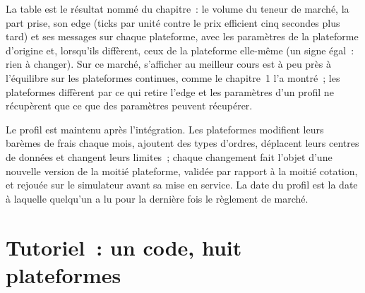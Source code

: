 La table est le résultat nommé du chapitre~: le volume du teneur de marché, la part prise, son edge (ticks par unité contre le prix efficient cinq secondes
plus tard) et ses messages sur chaque plateforme, avec les paramètres de la plateforme d'origine et, lorsqu'ils diffèrent, ceux de la plateforme elle-même (un signe égal~: rien à
changer). Sur ce marché, s'afficher au meilleur cours est à peu près à l'équilibre sur les plateformes continues, comme le chapitre~1 l'a montré~; les plateformes diffèrent par ce qui retire l'edge
et les paramètres d'un profil ne récupèrent que ce que des paramètres peuvent récupérer.

Le profil est maintenu après l'intégration. Les plateformes modifient leurs barèmes de frais chaque mois, ajoutent des types d'ordres, déplacent leurs centres de données et changent leurs limites~; chaque
changement fait l'objet d'une nouvelle version de la moitié plateforme, validée par rapport à la moitié cotation, et rejouée sur le simulateur avant sa mise en service. La date du profil
est la date à laquelle quelqu'un a lu pour la dernière fois le règlement de marché.

\section{Tutoriel~: un code, huit plateformes}\label{tut:hf:a-venue-playbook:tut}

